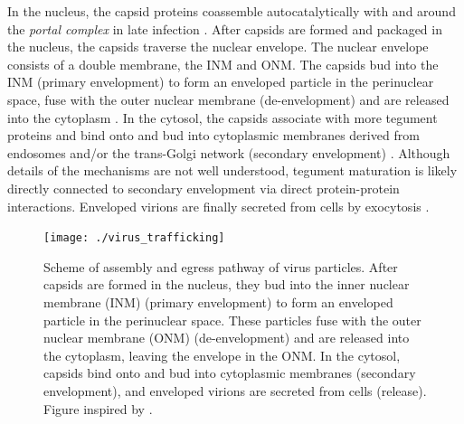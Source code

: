 In the nucleus, the \gls{capsid} proteins coassemble autocatalytically with and around the \emph{portal complex} in late infection \cite{[4]}.
After capsids are formed and packaged in the nucleus, the capsids %
traverse the nuclear envelope.
The nuclear envelope consists of a double membrane, the \gls{INM} and \gls{ONM}.
The \gls{capsid}s bud into the INM (primary envelopment) to form an enveloped particle in the perinuclear space, fuse with the outer nuclear membrane (de-envelopment) and are released into the cytoplasm \cite{[12]}. %
In the cytosol, the capsids associate with more tegument proteins and bind onto and bud into cytoplasmic membranes derived from endosomes and/or the trans-Golgi network (secondary envelopment) \cite{[13, 14]}.
Although details of the mechanisms are not well understood, tegument maturation is likely directly connected to secondary envelopment via direct protein-protein interactions.
Enveloped virions are finally secreted from cells by exocytosis \cite{[15, 16]}.
%

\begin{landscape}
  \begin{figure}
  \centering
  \texttt{[image: ./virus\_trafficking]}
  \caption[Scheme of assembly and egress pathway of virus particles.]{Scheme of assembly and egress pathway of virus particles.
  After capsids are formed in the nucleus, they bud into the inner nuclear membrane (INM) (primary envelopment) to form an enveloped particle in the perinuclear space.
  These particles fuse with the outer nuclear membrane (ONM) (de-envelopment) and are released into the cytoplasm, leaving the envelope in the ONM.
  In the cytosol, capsids bind onto and bud into cytoplasmic membranes (secondary envelopment), and enveloped virions are secreted from cells (release).
  Figure inspired by \cite{[2]}.}
  \label{fig:viral_egress}
  \end{figure}
\end{landscape}

